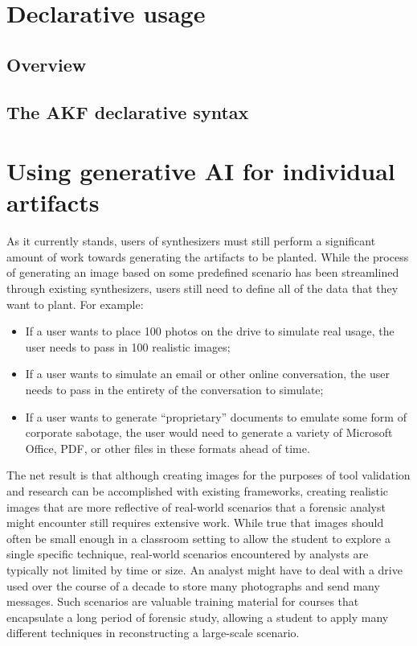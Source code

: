 \section{Declarative usage}\label{declarative-usage}

\subsection{Overview}\label{overview}

\subsection{The AKF declarative
syntax}\label{the-akf-declarative-syntax}

\section{Using generative AI for individual
artifacts}\label{using-generative-ai-for-individual-artifacts}

As it currently stands, users of synthesizers must still perform a
significant amount of work towards generating the artifacts to be
planted. While the process of generating an image based on some
predefined scenario has been streamlined through existing synthesizers,
users still need to define all of the data that they want to plant. For
example:

\begin{itemize}
\tightlist
\item
  If a user wants to place 100 photos on the drive to simulate real
  usage, the user needs to pass in 100 realistic images;
\item
  If a user wants to simulate an email or other online conversation, the
  user needs to pass in the entirety of the conversation to simulate;
\item
  If a user wants to generate ``proprietary'' documents to emulate some
  form of corporate sabotage, the user would need to generate a variety
  of Microsoft Office, PDF, or other files in these formats ahead of
  time.
\end{itemize}

The net result is that although creating images for the purposes of tool
validation and research can be accomplished with existing frameworks,
creating realistic images that are more reflective of real-world
scenarios that a forensic analyst might encounter still requires
extensive work. While true that images should often be small enough in a
classroom setting to allow the student to explore a single specific
technique, real-world scenarios encountered by analysts are typically
not limited by time or size. An analyst might have to deal with a drive
used over the course of a decade to store many photographs and send many
messages. Such scenarios are valuable training material for courses that
encapsulate a long period of forensic study, allowing a student to apply
many different techniques in reconstructing a large-scale scenario.

